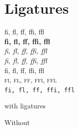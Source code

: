 \section{Ligatures}
\textrm{fi, fl, ff, ffi, ffl}\\
\textbf{fi, fl, ff, ffi, ffl}\\
\textit{fi, fl, ff, ffi, ffl}\\
\textsl{fi, fl, ff, ffi, ffl}\\
\textsf{fi, fl, ff, ffi, ffl}\\
\textsc{fi, fl, ff, ffi, ffl}\\
\texttt{fi, fl, ff, ffi, ffl}

with ligatures


Without
















